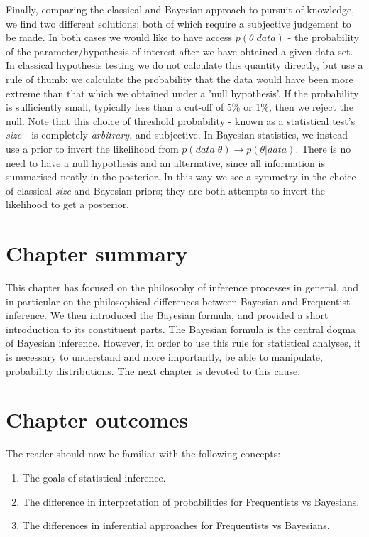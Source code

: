 \documentclass[11pt,fullpage]{book}
\begin{document}
Finally, comparing the classical and Bayesian approach to pursuit of knowledge, we find two different solutions; both of which require a subjective judgement to be made. In both cases we would like to have access $p(\theta|data)$ - the probability of the parameter/hypothesis of interest after we have obtained a given data set. In classical hypothesis testing we do not calculate this quantity directly, but use a rule of thumb: we calculate the probability that the data would have been more extreme than that which we obtained under a 'null hypothesis'. If the probability is sufficiently small, typically less than a cut-off of 5\% or 1\%, then we reject the null. Note that this choice of threshold probability - known as a statistical test's \textit{size} - is completely \textit{arbitrary}, and subjective. In Bayesian statistics, we instead use a prior to invert the likelihood from $p(data|\theta)\rightarrow p(\theta|data)$. There is no need to have a null hypothesis and an alternative, since all information is summarised neatly in the posterior. In this way we see a symmetry in the choice of classical \textit{size} and Bayesian priors; they are both attempts to invert the likelihood to get a posterior. 

\section{Chapter summary}
This chapter has focused on the philosophy of inference processes in general, and in particular on the philosophical differences between Bayesian and Frequentist inference. We then introduced the Bayesian formula, and provided a short introduction to its constituent parts. The Bayesian formula is the central dogma of Bayesian inference. However, in order to use this rule for statistical analyses, it is necessary to understand and more importantly, be able to manipulate, probability distributions. The next chapter is devoted to this cause.

\section{Chapter outcomes}
The reader should now be familiar with the following concepts:

\begin{enumerate}
\item The goals of statistical inference.
\item The difference in interpretation of probabilities for Frequentists vs Bayesians.
\item The differences in inferential approaches for Frequentists vs Bayesians.
\end{enumerate}
\end{document}
